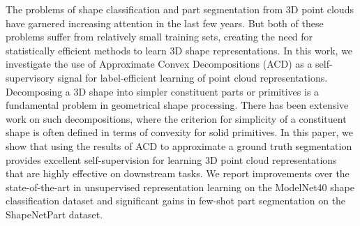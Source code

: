The problems of shape classification and part segmentation from 3D
point clouds have garnered increasing attention in the last few
years. %
But both of these problems suffer from relatively small training sets, creating the need for statistically efficient methods to learn 3D shape representations. In this work, 
we investigate the use of Approximate Convex Decompositions (ACD) as a self-supervisory signal for
label-efficient learning of point cloud representations.
Decomposing a 3D shape into simpler constituent parts or primitives is a fundamental problem in geometrical shape processing. 
There has been extensive work on such decompositions, where the criterion for simplicity of a constituent shape 
is often defined in terms of convexity for solid primitives.
In this paper, we show that using the results of ACD to approximate a ground truth segmentation provides excellent self-supervision for learning 3D point cloud representations that are highly effective on downstream tasks. 
We report improvements over the state-of-the-art in unsupervised representation learning on the ModelNet40 
shape classification dataset and significant gains in few-shot part segmentation on the ShapeNetPart dataset.
